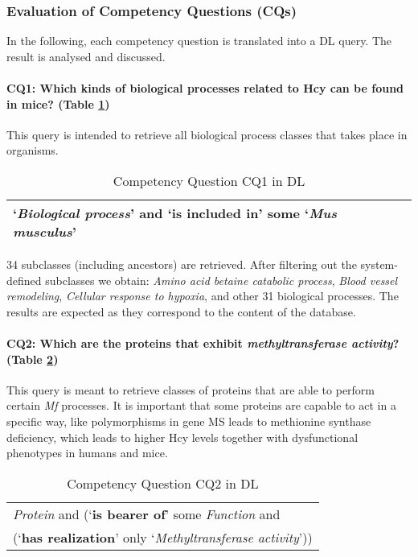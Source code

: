 \subsubsection*{Evaluation of Competency Questions (CQs)}
\label{section:CQ}
In the following, each competency question is translated into a DL query. The result is analysed and discussed.  

\paragraph{CQ1:	Which kinds of biological processes related to Hcy can be found in mice? (Table \ref{table:cq1})}
This query is intended to retrieve all biological process classes that takes place in organisms.  

\begin{table}[H]
	\caption{Competency Question CQ1 in DL}
	\centering
	\label{table:cq1}
	\begin{tabular}{p{3in}}
		\hline
			`\textit{Biological process}' and `\textbf{is included in}'  some `\textit{Mus musculus}' \\
		\hline
	\end{tabular} 
\end{table}

34 subclasses (including ancestors) are retrieved. After filtering out the system-defined subclasses we obtain: \textit{Amino acid betaine catabolic process}, \textit{Blood vessel remodeling}, \textit{Cellular response to hypoxia}, and other 31 biological processes. The results are expected 
as they correspond to the content of the database.

\paragraph{CQ2: Which are the proteins that exhibit \textit{methyltransferase activity}?  (Table \ref{table:CQ2})}
This query is meant to retrieve classes of proteins that are able to perform certain \textit{Mf} processes. It is important that some proteins are capable to act in a specific way, like polymorphisms in gene MS leads to methionine synthase deficiency, which leads to higher Hcy levels together with dysfunctional phenotypes in humans and mice. 
\begin{table}[H]
	\caption{Competency Question CQ2 in DL}
	\centering
	\label{table:CQ2}

\begin{tabular}{p{3in}}
	\hline  
		\textit{Protein} and (`\textbf{is bearer of}' some \textit{Function} and \\
		\hspace{0.5cm} (`\textbf{has realization}' only `\textit{Methyltransferase activity}')) \\ 
	\hline 
\end{tabular} 
\end{table}

